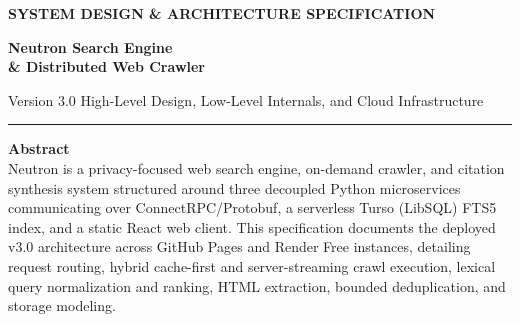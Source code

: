 \documentclass[10pt,a4paper]{article}
\begin{document}
\color{BodyInk}
\sloppy

\begin{titlepage}
\thispagestyle{empty}

\vspace*{0.4cm}
{\fontsize{9.5}{12}\selectfont\bfseries\color{TealAccent} SYSTEM DESIGN \& ARCHITECTURE SPECIFICATION}

\vspace{0.2cm}
{\fontsize{28}{33}\selectfont\bfseries\color{HeadingInk} Neutron Search Engine\\\& Distributed Web Crawler}

\vspace{0.25cm}
{\fontsize{12.5}{17}\selectfont\color{MutedInk} Version 3.0 \textemdash{} High-Level Design, Low-Level Internals, and Cloud Infrastructure}

\vspace{0.45cm}
\noindent\rule{\textwidth}{0.6pt}
\vspace{0.3cm}

\textbf{\color{HeadingInk}Abstract}\\[0.2em]
Neutron is a privacy-focused web search engine, on-demand crawler, and citation synthesis system structured around three decoupled Python microservices communicating over ConnectRPC/Protobuf, a serverless Turso (LibSQL) FTS5 index, and a static React web client. This specification documents the deployed v3.0 architecture across GitHub Pages and Render Free instances, detailing request routing, hybrid cache-first and server-streaming crawl execution, lexical query normalization and ranking, HTML extraction, bounded deduplication, and storage modeling.


\end{titlepage}
\end{document}

